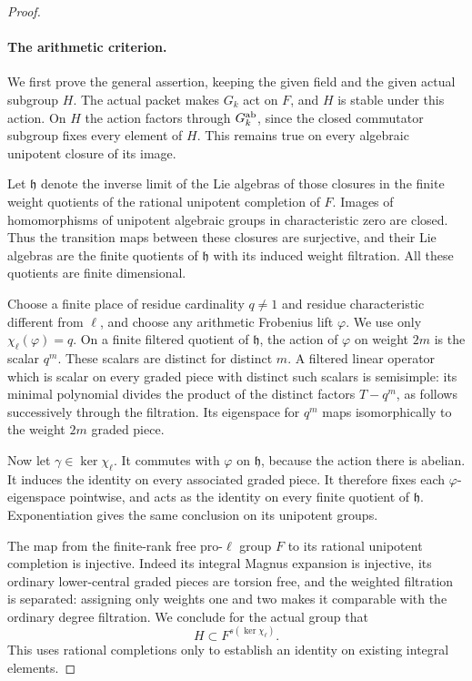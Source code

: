 \begin{proof}
\paragraph{The arithmetic criterion.}
We first prove the general assertion, keeping the
given field and the given actual subgroup \(H\).
The actual packet makes \(G_k\) act on \(F\), and
\(H\) is stable under this action. On \(H\) the
action factors through \(G_k^{\rm ab}\), since the
closed commutator subgroup fixes every element of
\(H\). This remains true on every algebraic unipotent
closure of its image.

Let \(\mathfrak h\) denote the inverse limit of the
Lie algebras of those closures in the finite weight
quotients of the rational unipotent completion of
\(F\). Images of homomorphisms of unipotent algebraic
groups in characteristic zero are closed. Thus the
transition maps between these closures are surjective,
and their Lie algebras are the finite quotients of
\(\mathfrak h\) with its induced weight filtration.
All these quotients are finite dimensional.

Choose a finite place of residue cardinality \(q\ne1\)
and residue characteristic different from \(\ell\),
and choose any arithmetic Frobenius lift \(\varphi\).
We use only \(\chi_\ell(\varphi)=q\). On a finite
filtered quotient of \(\mathfrak h\), the action of
\(\varphi\) on weight \(2m\) is the scalar \(q^m\).
These scalars are distinct for distinct \(m\).
A filtered linear operator which is scalar on every
graded piece with distinct such scalars is semisimple:
its minimal polynomial divides the product of the
distinct factors \(T-q^m\), as follows successively
through the filtration. Its eigenspace for \(q^m\)
maps isomorphically to the weight \(2m\) graded piece.

Now let \(\gamma\in\ker\chi_\ell\). It commutes
with \(\varphi\) on \(\mathfrak h\), because the
action there is abelian. It induces the identity on
every associated graded piece. It therefore fixes
each \(\varphi\)-eigenspace pointwise, and acts as
the identity on every finite quotient of
\(\mathfrak h\). Exponentiation gives the same
conclusion on its unipotent groups.

The map from the finite-rank free pro-\(\ell\)
group \(F\) to its rational unipotent completion is
injective. Indeed its integral Magnus expansion is
injective, its ordinary lower-central graded pieces
are torsion free, and the weighted filtration is
separated: assigning only weights one and two makes
it comparable with the ordinary degree filtration.
We conclude for the actual group that
\[
                     H\subset F^{s(\ker\chi_\ell)}.
                                                            \tag{A.38.2}
\]
This uses rational completions only to establish an
identity on existing integral elements.


\end{proof}

